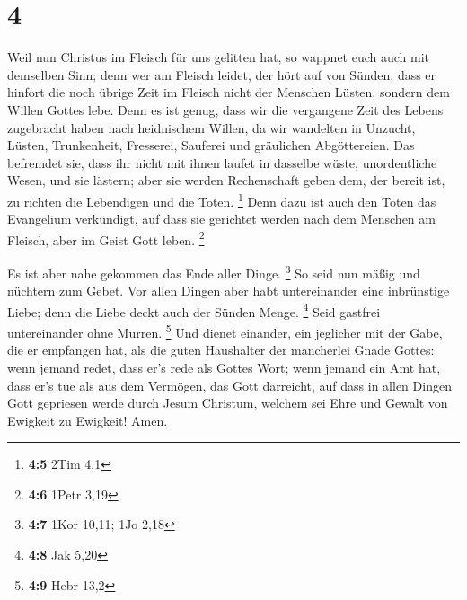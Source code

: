 \hypertarget{section-2}{%
\section{4}\label{section-2}}

 Weil nun Christus im Fleisch für uns gelitten hat, so
wappnet euch auch mit demselben Sinn; denn wer am Fleisch leidet, der
hört auf von Sünden,  dass er hinfort die noch übrige Zeit
im Fleisch nicht der Menschen Lüsten, sondern dem Willen Gottes lebe.
 Denn es ist genug, dass wir die vergangene Zeit des
Lebens zugebracht haben nach heidnischem Willen, da wir wandelten in
Unzucht, Lüsten, Trunkenheit, Fresserei, Sauferei und gräulichen
Abgöttereien.  Das befremdet sie, dass ihr nicht mit ihnen
laufet in dasselbe wüste, unordentliche Wesen, und sie lästern;
 aber sie werden Rechenschaft geben dem, der bereit ist,
zu richten die Lebendigen und die Toten. \footnote{\textbf{4:5} 2Tim 4,1}
 Denn dazu ist auch den Toten das Evangelium verkündigt,
auf dass sie gerichtet werden nach dem Menschen am Fleisch, aber im
Geist Gott leben. \footnote{\textbf{4:6} 1Petr 3,19}

 Es ist aber nahe gekommen das Ende aller Dinge.
\footnote{\textbf{4:7} 1Kor 10,11; 1Jo 2,18}  So seid nun
mäßig und nüchtern zum Gebet. Vor allen Dingen aber habt untereinander
eine inbrünstige Liebe; denn die Liebe deckt auch der Sünden Menge.
\footnote{\textbf{4:8} Jak 5,20}  Seid gastfrei
untereinander ohne Murren. \footnote{\textbf{4:9} Hebr 13,2}
 Und dienet einander, ein jeglicher mit der Gabe, die er
empfangen hat, als die guten Haushalter der mancherlei Gnade Gottes:
 wenn jemand redet, dass er's rede als Gottes Wort; wenn
jemand ein Amt hat, dass er's tue als aus dem Vermögen, das Gott
darreicht, auf dass in allen Dingen Gott gepriesen werde durch Jesum
Christum, welchem sei Ehre und Gewalt von Ewigkeit zu Ewigkeit! Amen.

